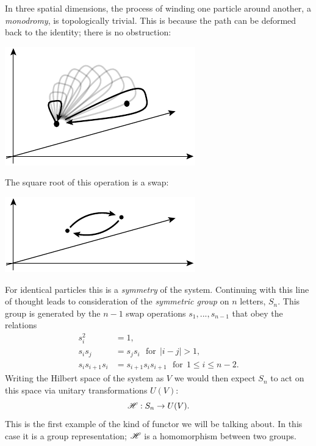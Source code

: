 In three spatial dimensions, the process of winding one
particle around another, a \emph{monodromy}, is topologically trivial.
This is because the path can be deformed back to the
identity; there is no obstruction:
\begin{center}
\includegraphics[]{pic-monodromy3d.pdf}
\end{center}
The square root of this operation is a swap:
\begin{center}
\includegraphics[]{pic-swap.pdf}
\end{center}
For identical particles this is a \emph{symmetry} of the system. 
Continuing with this line of thought 
leads to consideration of the \emph{symmetric group}
on $n$ letters, $S_n$. 
This group is generated by the $n-1$ swap operations
$s_1,...,s_{n-1}$ that obey the relations
\begin{align*}
    s_i^2 &= 1, \\
    s_i s_j &= s_j s_i \ \ \ \mbox{for}\ \ |i-j|>1,\\
    s_i s_{i+1} s_i &= s_{i+1} s_i s_{i+1} \ \ \ \mbox{for}\ \ 1\le i \le n-2.
\end{align*}
Writing the Hilbert space of the system as $V$ 
we would then expect $S_n$ to act on this space via unitary transformations $U(V):$
$$
    \mathscr{H} : S_n \to U(V).
$$
This is the first example of the kind of functor we will be talking about. 
In this case it is a group representation; $\mathscr{H}$ is a homomorphism between
two groups.

